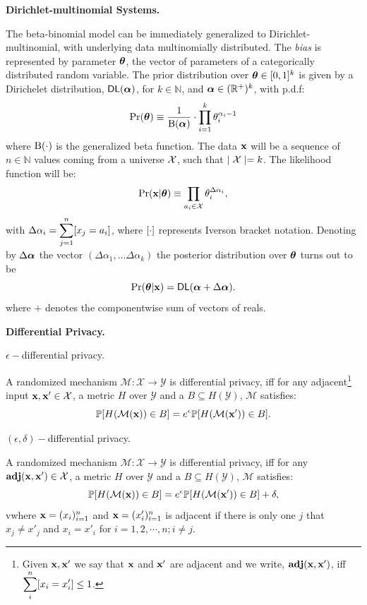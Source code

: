 \documentclass{article}
\begin{document}
\noindent \textbf{Dirichlet-multinomial Systems.}

The beta-binomial model can be immediately generalized to Dirichlet-multinomial, with underlying data multinomially distributed. The \emph{bias} is represented by parameter $\boldsymbol{\theta}$, the vector of parameters of a categorically distributed random variable. The prior distribution over $\boldsymbol{\theta}\in [0,1]^{k}$
is given by a Dirichelet distribution, $\mathsf{DL}(\boldsymbol{\alpha})$, for $k\in\mathbb{N}$,
and $\boldsymbol{\alpha}\in(\mathbb{R}^{+})^{k}$, with p.d.f:
\[
  \Pr(\boldsymbol{\theta})\equiv\frac{1}{\boldsymbol{\textup{B}}(\boldsymbol{\alpha})}\cdot \displaystyle\prod_{i=1}^{k}{\theta_i^{\alpha_i-1}}
\]
where $\boldsymbol{\textup{B}}(\cdot)$ is the generalized beta function.
The data $\textbf{x}$ will be a sequence of $n\in\mathbb{N}$ values
coming from a universe $\mathcal{X}$, such that $\mid\mathcal{X} \mid=k$.
The likelihood function will be:
\[
  \Pr(\textbf{x}|\boldsymbol{\theta})\equiv \displaystyle\prod_{a_i\in\mathcal{X}}\theta_{i}^{\Delta \alpha_i},
\]
with $\Delta \alpha_i=\displaystyle\sum_{j=1}^{n}[x_j=a_i]$, where $[\cdot]$ represents Iverson bracket notation.
Denoting by $\Delta\boldsymbol{\alpha}$ the vector $(\Delta\alpha_1,\dots \Delta\alpha_k)$ the posterior distribution over $\boldsymbol{\theta}$ turns out to be
\[
  \Pr(\boldsymbol{\theta}|\textbf{x})=\mathsf{DL}(\boldsymbol{\alpha}+\Delta \boldsymbol{\alpha}). 
\]
where $+$ denotes the componentwise sum of vectors of reals. 

\noindent \textbf{Differential Privacy.} 
\begin{definition}
\label{def_epsilon_dp}
$\epsilon-$differential privacy.

A randomized mechanism $\mathcal{M}: \mathcal{X} \rightarrow \mathcal{Y}$ is differential privacy, iff for any adjacent\footnote{Given $\textbf{x}, \textbf{x}'$  we say that $\textbf{x}$ and $\textbf{x}'$ are adjacent and we write, $\textbf{adj}(\textbf{x},\textbf{x}')$, iff\\
$\displaystyle \sum_{i}^{n}[x_i = x'_i ]\leq 1$. } input $\textbf{x}, \textbf{x}' \in \mathcal{X}$, a metric $H$ over $\mathcal{Y}$ and a $B \subseteq H(\mathcal{Y})$, $\mathcal{M}$ satisfies:
\begin{equation*}
\mathbb{P}[H(\mathcal{M}(\textbf{x})) \in B] = e^\epsilon \mathbb{P}[H(\mathcal{M}(\textbf{x}')) \in B].
\end{equation*}

\end{definition}

\begin{definition}
\label{def_epsilon_delta_dp}
$(\epsilon,\delta)-$differential privacy.

A randomized mechanism $\mathcal{M}: \mathcal{X} \rightarrow \mathcal{Y}$ is differential privacy, iff for any $\textbf{adj}(\textbf{x},\textbf{x}') \in \mathcal{X}$, a metric $H$ over $\mathcal{Y}$ and a $B \subseteq H(\mathcal{Y})$, $\mathcal{M}$ satisfies:
\begin{equation*}
\mathbb{P}[H(\mathcal{M}(\textbf{x})) \in B] = e^\epsilon \mathbb{P}[H(\mathcal{M}(\textbf{x}')) \in B] + \delta,
\end{equation*}
vwhere $\textbf{x} = (x_i)_{i = 1}^n$ and $\textbf{x} = (x'_i)_{i = 1}^n$ is adjacent if there is only one $j$ that $x_j \neq x'_j$ and $x_i = x'_i$ for $i = 1, 2, \cdots, n; i \neq j$. 
\end{definition}
\end{document}

